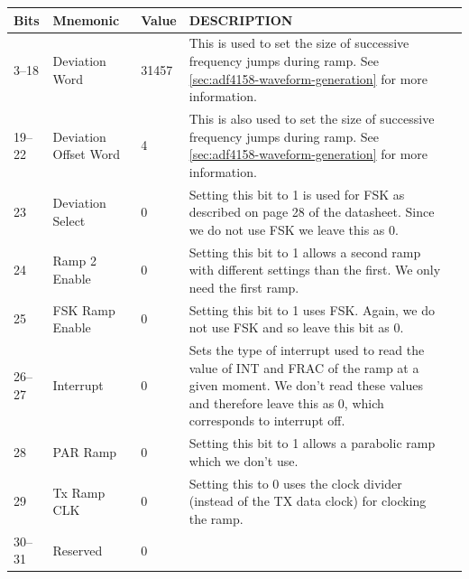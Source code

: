 \label{tab:adf4158-reg-map-5}
\begin{tabularx}{\textwidth}{l l l X>{\raggedright\arraybackslash}X}
        \caption{DEVIATION REGISTER (R5) MAP} \\
        \toprule
        \textbf{Bits} & \textbf{Mnemonic} & \textbf{Value} & \textbf{DESCRIPTION} \\
        \midrule

        \endhead{}

        3--18 & Deviation Word & 31457 & This is used to set the size of successive frequency jumps during
        ramp. See \cref{sec:adf4158-waveform-generation} for more
        information. \\
        19--22 & Deviation Offset Word & 4 & This is also used to set the size of successive frequency
        jumps during ramp. See \cref{sec:adf4158-waveform-generation}
        for more information. \\
        23 & Deviation Select & 0 & Setting this bit to 1 is used for FSK as described on page 28 of the
        datasheet. Since we do not use FSK we leave this as 0. \\
        24 & Ramp 2 Enable & 0 & Setting this bit to 1 allows a second ramp with different settings than
        the first. We only need the first ramp. \\
        25 & FSK Ramp Enable & 0 & Setting this bit to 1 uses FSK. Again, we do not use FSK and so leave
        this bit as 0. \\
        26--27 & Interrupt & 0 & Sets the type of interrupt used to read the value of INT and FRAC of the
        ramp at a given moment. We don't read these values and therefore leave
        this as 0, which corresponds to interrupt off. \\
        28 & PAR Ramp & 0 & Setting this bit to 1 allows a parabolic ramp which we don't use. \\
        29 & Tx Ramp CLK & 0 & Setting this to 0 uses the clock divider (instead of the TX data clock) for
        clocking the ramp. \\
        30--31 & Reserved & 0 & \\

        \bottomrule
\end{tabularx}


